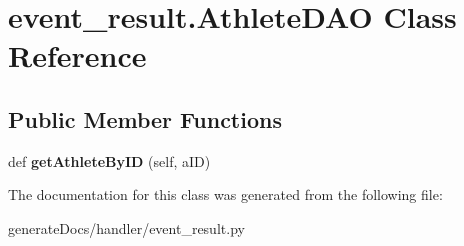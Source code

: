 \hypertarget{classevent__result_1_1_athlete_d_a_o}{}\section{event\+\_\+result.\+Athlete\+D\+AO Class Reference}
\label{classevent__result_1_1_athlete_d_a_o}
\subsection*{Public Member Functions}
\begin{DoxyCompactItemize}
\item 
\mbox{\label{classevent__result_1_1_athlete_d_a_o_a388481f73911ef44f1b1450226334fbd}} 
def {\bfseries get\+Athlete\+By\+ID} (self, a\+ID)
\end{DoxyCompactItemize}


The documentation for this class was generated from the following file\+:\begin{DoxyCompactItemize}
\item 
generate\+Docs/handler/event\+\_\+result.\+py\end{DoxyCompactItemize}
